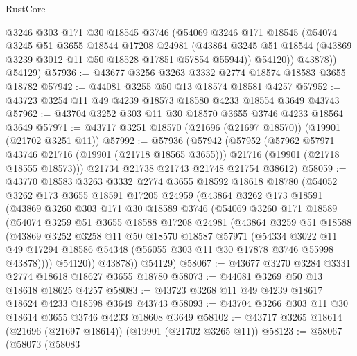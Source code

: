 \begin{lexlean}{RustCore}
\begin{coremodule}
          @3246
          @303
          @171
          @30
          @18545
          @3746
          (@54069
            @3246
            @171
            @18545
            (@54074
              @3245
              @51
              @3655
              @18544
              @17208
              @24981
              (@43864 @3245 @51 @18544 (@43869 @3239 @3012 @11 @50 @18528 @17851 @57854 @55944))
              @54120))
          @43878))
      @54129)
@57936 := @43677 @3256 @3263 @3332 @2774 @18574 @18583 @3655 @18782
@57942 := @44081 @3255 @50 @13 @18574 @18581 @4257
@57952 := @43723 @3254 @11 @49 @4239 @18573 @18580 @4233 @18554 @3649 @43743
@57962 := @43704 @3252 @303 @11 @30 @18570 @3655 @3746 @4233 @18564 @3649
@57971 := @43717 @3251 @18570 (@21696 (@21697 @18570)) (@19901 (@21702 @3251 @11))
@57992 := @57936
    (@57942
      (@57952
        (@57962 @57971 @43746 @21716 (@19901 (@21718 @18565 @3655)))
        @21716
        (@19901 (@21718 @18555 @18573)))
      @21734
      @21738
      @21743
      @21748
      @21754
      @38612)
@58059 := @43770
    @18583
    @3263
    @3332
    @2774
    @3655
    @18592
    @18618
    @18780
    (@54052
      @3262
      @173
      @3655
      @18591
      @17205
      @24959
      (@43864
        @3262
        @173
        @18591
        (@43869
          @3260
          @303
          @171
          @30
          @18589
          @3746
          (@54069
            @3260
            @171
            @18589
            (@54074
              @3259
              @51
              @3655
              @18588
              @17208
              @24981
              (@43864
                @3259
                @51
                @18588
                (@43869
                  @3252
                  @3258
                  @11
                  @50
                  @18570
                  @18587
                  @57971
                  (@54334
                    @3022
                    @11
                    @49
                    @17294
                    @18586
                    @54348
                    (@56055 @303 @11 @30 @17878 @3746 @55998 @43878))))
              @54120))
          @43878))
      @54129)
@58067 := @43677 @3270 @3284 @3331 @2774 @18618 @18627 @3655 @18780
@58073 := @44081 @3269 @50 @13 @18618 @18625 @4257
@58083 := @43723 @3268 @11 @49 @4239 @18617 @18624 @4233 @18598 @3649 @43743
@58093 := @43704 @3266 @303 @11 @30 @18614 @3655 @3746 @4233 @18608 @3649
@58102 := @43717 @3265 @18614 (@21696 (@21697 @18614)) (@19901 (@21702 @3265 @11))
@58123 := @58067
    (@58073
      (@58083

\end{coremodule}
\end{lexlean}
